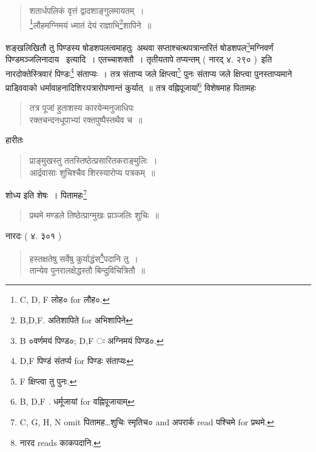 \documentclass[11pt, openany]{book}
\begin{document}
\begin{quote}
{\vy शतार्धपलिकं वृत्तं द्वादशाङ्गुलमायतम्~।\\
\renewcommand{\thefootnote}{2}\footnote{C, D, F लोह० for लौह०.}लौहमग्निमयं ध्मातं देयं राज्ञाभि\renewcommand{\thefootnote}{3}\footnote{B,D,F. अतिशापिते for अभिशापिने\textendash }शापिने~॥}
\end{quote}

शङ्खलिखितौ तु पिण्डस्य षोडशपलत्वमाहतुः\textendash\ अथवा सप्ताश्चत्थपत्रान्तरितं षोडशपल\renewcommand{\thefootnote}{4}\footnote{B ०वर्णमयं पिण्ड०; D,F ः अग्निमयं पिण्ड०.}मग्निवर्णं पिण्डमञ्जलिनादाय \textendash\ इत्यादि~। एतच्चाशक्तौ~। तृतीयतापे तप्यन्तम् ( नारद् ४. २९० )\textendash\ इति नारदोक्तेस्त्रिवारं पिण्डः\renewcommand{\thefootnote}{5}\footnote{D,F पिण्डं संतर्प्य for पिण्डः संताप्यः} संताप्यः~। तत्र संताप्य जले क्षिप्त्वा\renewcommand{\thefootnote}{6}\footnote{F क्षिप्त्वा तु पुनः.} पुनः संताप्य जले क्षिप्त्वा पुनस्ताप्यमाने प्राड्विवाको धर्मावाहनादिशिरःपत्रारोपणान्तं कुर्यात्~॥ तत्र वह्निपूजायां\renewcommand{\thefootnote}{7}\footnote{B, D,F . धर्मूजायां for वह्निपूजायाम्} विशेषमाह पितामहः 

\begin{quote}
{\vy तत्र पूजां हुताशस्य कारयेन्मनुजाधिपः\\
रक्तचन्दनधूपाभ्यां रक्तपुष्पैस्तथैव च~॥}
\end{quote}

हारीतः 

\begin{quote}
{\vy प्राङ्मुखस्तु ततस्तिष्ठेत्प्रसारितकराङ्मुलिः~।\\
आर्द्रवासाः शुचिश्चैव शिरस्यारोप्य पत्रकम्~॥}
\end{quote}

शोध्य इति शेषः~। पितामहः\renewcommand{\thefootnote}{8}\footnote{C, G, H, N omit पितामह\ldots शुचिः स्मृतिच० and अपरार्क read पश्चिमे for प्रथमे.}

\begin{quote}
{\vy प्रथमे मण्डले तिष्ठेत्प्राग्मुखः प्राञ्जलिः शुचिः~॥}
\end{quote}

\newpage

नारदः ( ४. ३०१ ) 

\begin{quote}
{\vy हस्तक्षतेषु सर्वेषु कुर्याद्धंस\renewcommand{\thefootnote}{1}\footnote{नारद reads काकपदानि.}पदानि तु~।\\
तान्येव पुनरालक्षेद्धस्तौ बिन्दुविचित्रितौ~॥}
\end{quote}
\end{document}
